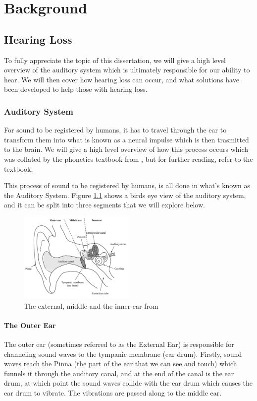 \documentclass[logo,bsc,singlespacing,parskip,online]{infthesis}
\begin{document}
\chapter{Background}
\label{ch:background}

\section{Hearing Loss}
To fully appreciate the topic of this dissertation,
we will give a high level overview of the auditory system 
which is ultimately responsible for our ability to hear.
We will then cover how hearing loss can occur, and 
what solutions have been developed to help those with hearing loss.
\subsection{Auditory System}
For sound to be registered by humans, it has to travel through the ear to transform them into
what is known as a neural impulse which is then trasmitted to the brain. We will 
give a high level overview of how this process occurs which was collated by the phonetics textbook from \citet{Wayland2018Phonetics},
 but for further reading, refer to the textbook. 

 This process of sound to be registered by humans, is all done in what's known as the Auditory System.
 Figure \ref{fig:ear} shows a birds eye view of the auditory system, and it can be split into three segments
 that we will explore below.

\begin{figure}[h]
   \centering
   \includegraphics[width=0.5\textwidth]{wayland-ear}
   \caption{The external, middle and the inner ear from \citet{Wayland2018Phonetics}}
   \label{fig:ear}
\end{figure}

\subsubsection{The Outer Ear}
The outer ear (sometimes referred to as the External Ear) is responsible for channeling sound waves to the tympanic membrane (ear drum). Firstly,
sound waves reach the Pinna (the part of the ear that we can see and touch) which funnels it through the auditory canal, and at the end of the canal 
is the ear drum, at which point the sound waves collide with the ear drum which causes the ear drum to vibrate. 
The vibrations are passed along to the middle ear.
\end{document}
